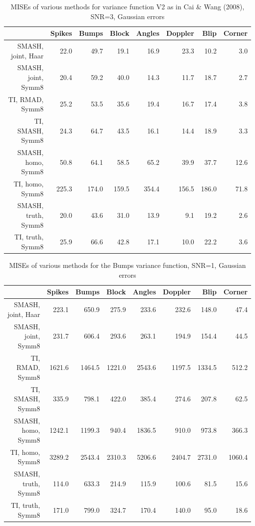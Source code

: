 \documentclass[12pt]{article}
\begin{document}
\begin{table}[ht]
\centering
\begin{tabular}{rrrrrrrr}
  \hline
 & Spikes & Bumps & Block & Angles & Doppler & Blip & Corner \\
  \hline
SMASH, joint, Haar & 22.0 & 49.7 & 19.1 & 16.9 & 23.3 & 10.2 & 3.0 \\
  SMASH, joint, Symm8 & 20.4 & 59.2 & 40.0 & 14.3 & 11.7 & 18.7 & 2.7 \\
  TI, RMAD, Symm8 & 25.2 & 53.5 & 35.6 & 19.4 & 16.7 & 17.4 & 3.8 \\
  TI, SMASH, Symm8 & 24.3 & 64.7 & 43.5 & 16.1 & 14.4 & 18.9 & 3.3 \\
  SMASH, homo, Symm8 & 50.8 & 64.1 & 58.5 & 65.2 & 39.9 & 37.7 & 12.6 \\
  TI, homo, Symm8 & 225.3 & 174.0 & 159.5 & 354.4 & 156.5 & 186.0 & 71.8 \\
  SMASH, truth, Symm8 & 20.0 & 43.6 & 31.0 & 13.9 & 9.1 & 19.2 & 2.6 \\
  TI, truth, Symm8 & 25.9 & 66.6 & 42.8 & 17.1 & 10.0 & 22.2 & 3.6 \\
   \hline
\end{tabular}
\caption{MISEs of various methods for variance function V2 as in Cai \& Wang (2008), SNR=3, Gaussian errors}
\end{table}
\begin{table}[ht]
\centering
\begin{tabular}{rrrrrrrr}
  \hline
 & Spikes & Bumps & Block & Angles & Doppler & Blip & Corner \\
  \hline
SMASH, joint, Haar & 223.1 & 650.9 & 275.9 & 233.6 & 232.6 & 148.0 & 47.4 \\
  SMASH, joint, Symm8 & 231.7 & 606.4 & 293.6 & 263.1 & 194.9 & 154.4 & 44.5 \\
  TI, RMAD, Symm8 & 1621.6 & 1464.5 & 1221.0 & 2543.6 & 1197.5 & 1334.5 & 512.2 \\
  TI, SMASH, Symm8 & 335.9 & 798.1 & 422.0 & 385.4 & 274.6 & 207.8 & 62.5 \\
  SMASH, homo, Symm8 & 1242.1 & 1199.3 & 940.4 & 1836.5 & 910.0 & 973.8 & 366.3 \\
  TI, homo, Symm8 & 3289.2 & 2543.4 & 2310.3 & 5206.6 & 2404.7 & 2731.0 & 1060.4 \\
  SMASH, truth, Symm8 & 114.0 & 633.3 & 214.9 & 115.9 & 100.6 & 81.5 & 15.6 \\
  TI, truth, Symm8 & 171.0 & 799.0 & 324.7 & 170.4 & 140.0 & 95.0 & 18.6 \\
   \hline
\end{tabular}
\caption{MISEs of various methods for the Bumps variance function, SNR=1, Gaussian errors}
\end{table}
\end{document}
